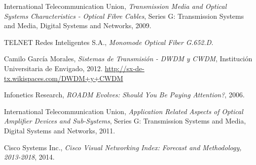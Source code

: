 
\begin{thebibliography}{9}

  International Telecommunication Union,
  \emph{Transmission Media and Optical Systems Characteristics - Optical Fibre Cables},
  Series G: Transmission Systems and Media, Digital Systems and Networks,
  2009.

  TELNET Redes Inteligentes S.A.,
  \emph{Monomode Optical Fiber G.652.D}.
  
  Camilo Garc\'ia Morales,
  \emph{Sistemas de Transmisi\'on - DWDM y CWDM},
  Instituci\'on Universitaria de Envigado,
  2012.
  \url{http://sx-de-tx.wikispaces.com/DWDM+y+CWDM}
  
  Infonetics Research,
  \emph{ROADM Evolves: Should You Be Paying Attention?},
  2006.

  International Telecommunication Union,
  \emph{Application Related Aspects of Optical Amplifier Devices and Sub-Systems},
  Series G: Transmission Systems and Media, Digital Systems and Networks,
  2011.

  Cisco Systems Inc.,
  \emph{Cisco Visual Networking Index: Forecast and Methodology, 2013-2018},
  2014.

\end{thebibliography}